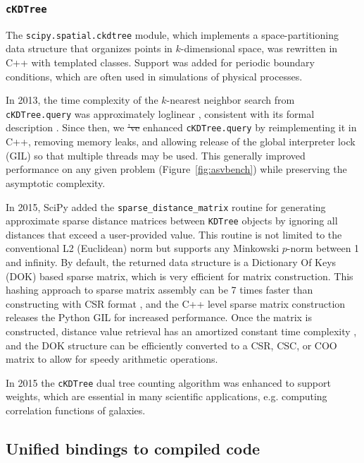 \documentclass[fleqn,10pt]{wlscirep}
\providecommand{\DIFadd}[1]{{\protect\color{blue}\uwave{#1}}} %
\providecommand{\DIFdel}[1]{{\protect\color{red}\sout{#1}}}                      %
\providecommand{\DIFaddbegin}{} %
\providecommand{\DIFaddend}{} %
\providecommand{\DIFdelbegin}{} %
\providecommand{\DIFdelend}{} %
\begin{document}
\subsubsection*{\texttt{cKDTree}}

The \texttt{scipy.spatial.ckdtree} module, which implements a space-partitioning data structure that
organizes points in $k$-dimensional space, was rewritten in C++ with templated classes.
Support was added for periodic boundary conditions, which are often used
in simulations of physical processes.

In 2013, the time complexity of the $k$-nearest neighbor search from
\texttt{cKDTree.query} was approximately loglinear \cite{knn-jake},
consistent with its formal description \cite{kdtree-search-algo}.
Since then, we \DIFdelbegin \DIFdel{'ve }\DIFdelend \DIFaddbegin \DIFadd{have }\DIFaddend enhanced \texttt{cKDTree.query} by reimplementing it in
C++, removing memory leaks, and allowing release of the global interpreter lock (GIL) so that
multiple threads may be used\cite{gh-4374}. This generally improved
performance on any given problem (Figure~\ref{fig:asvbench})
while preserving the asymptotic complexity.

In 2015, SciPy added the \texttt{sparse\_distance\_matrix} routine for generating
approximate sparse distance matrices between \texttt{KDTree} objects by ignoring
all distances that exceed a user-provided value. This routine is not
limited to the conventional L2 (Euclidean) norm but supports any Minkowski
$p$-norm between 1 and infinity. By default, the returned data structure is a
Dictionary Of Keys (DOK) based sparse matrix, which is very efficient for matrix
construction. This hashing approach to sparse matrix assembly can be 7 times
faster than constructing with CSR format
\cite{10.1007/978-3-540-75755-9_107}, and the C++ level sparse matrix construction
releases the Python GIL for increased performance. Once the matrix is constructed,
distance value retrieval has an amortized constant time complexity
\cite{Cormen:2001:IA:580470}, and the DOK structure can be efficiently converted
to a CSR, CSC, or COO matrix to allow for
speedy arithmetic operations.

In 2015 the \texttt{cKDTree} dual tree counting algorithm\cite{Moore2000ar}
was enhanced to support weights\cite{ckdtree-weights}, which are
essential in many scientific applications, e.g. computing correlation
functions of galaxies\cite{0004-637X-750-1-38}.

\subsection*{Unified bindings to compiled code}
\end{document}
